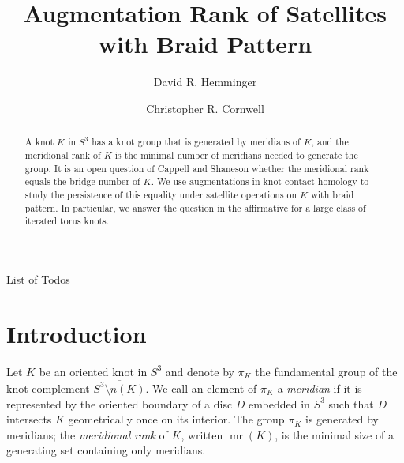 \documentclass{amsart}[11pt,fullpage]
\makeatletter
\def\mr{\operatorname{mr}}
\theoremstyle{definition}
\def\listtodoname{List of Todos}
\def\listoftodos{\@starttoc{tdo}\listtodoname}
\makeatother
\begin{document}
\listoftodos
\newpage





\title{Augmentation Rank of Satellites with Braid Pattern}

\author{David R. Hemminger}
\author{Christopher R. Cornwell}

\begin{abstract}
A knot $K$ in $S^3$ has a knot group that is generated by meridians of $K$, and the meridional rank of $K$ is the minimal number of meridians needed to generate the group. It is an open question of Cappell and Shaneson whether the meridional rank equals the bridge number of $K$. We use augmentations in knot contact homology to study the persistence of this equality under satellite operations on $K$ with braid pattern. In particular, we answer the question in the affirmative for a large class of iterated torus knots.
\end{abstract}

\maketitle

\section{Introduction}
Let $K$ be an oriented knot in $S^3$ and denote by $\pi_K$ the fundamental group of the knot complement $\overline{S^3\setminus n(K)}$. We call an element of $\pi_K$ a \emph{meridian} if it is represented by the oriented boundary of a disc $D$ embedded in $S^3$ such that $D$ intersects $K$ geometrically once on its interior. The group $\pi_K$ is generated by meridians; the \emph{meridional rank} of $K$, written $\mr(K)$, is the minimal size of a generating set containing only meridians. 
\end{document}
